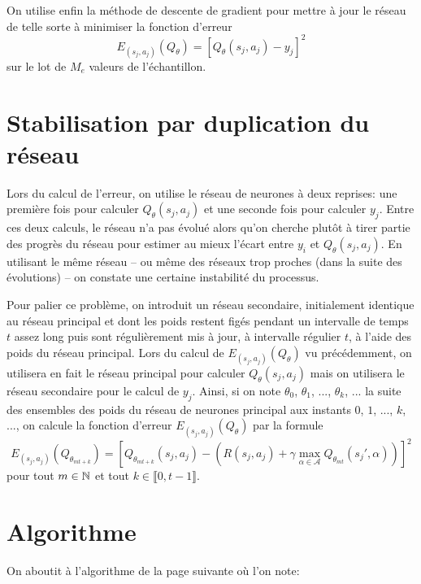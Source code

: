 On utilise enfin la méthode de descente de gradient pour mettre à jour le réseau de telle sorte à minimiser la fonction d'erreur 
$$E_{(s_j,a_j)}(Q_{\theta})=\left[Q_{\theta}(s_j,a_j)-y_j\right]^2$$
sur le lot de $M_e$ valeurs de l'échantillon. 

\section{Stabilisation par duplication du réseau}

Lors du calcul de l'erreur, on utilise le réseau de neurones à deux reprises: une première fois pour calculer $Q_{\theta}(s_j,a_j)$ et une seconde fois pour calculer $y_j$. Entre ces deux calculs, le réseau n'a pas évolué alors qu'on cherche plutôt à tirer partie des \og progrès \fg{} du réseau pour estimer au mieux l'écart entre $y_i$ et $Q_{\theta}(s_j,a_j)$. En utilisant le même réseau -- ou même des réseaux trop proches (dans la suite des évolutions) -- on constate une certaine instabilité du processus.

Pour palier ce problème, on introduit un réseau secondaire, initialement identique au réseau principal et dont les poids restent figés pendant un intervalle de temps $t$ assez long puis sont régulièrement mis à jour, à intervalle régulier $t$, à l'aide des poids du réseau principal. Lors du calcul de $E_{(s_j, a_j)}(Q_{\theta})$ vu précédemment, on utilisera en fait le réseau principal pour calculer $Q_{\theta}(s_j, a_j)$ mais on utilisera le réseau secondaire pour le calcul de $y_j$. Ainsi, si on note $\theta_0$, $\theta_1$, ..., $\theta_k$, ... la suite des ensembles des poids du réseau de neurones principal aux instants $0$, $1$, ..., $k$, ..., on calcule la fonction d'erreur $E_{(s_j, a_j)}(Q_{\theta})$ par la formule
$$E_{(s_j, a_j)}(Q_{\theta_{mt+k}})=\left[Q_{\theta_{mt+k}}(s_j,a_j) - \left(R(s_j,a_j)+\gamma\mathop{\max}\limits_{\alpha\in\mathcal{A}} Q_{\theta_{mt}}(s_j',\alpha)\right)\right]^2$$
pour tout $m\in\mathbb{N}$ et tout $k\in\llbracket 0, t-1\rrbracket$. 

\section{Algorithme}

On aboutit à l'algorithme de la page suivante où l'on note: 

